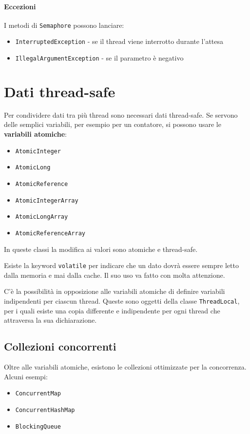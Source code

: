 \paragraph{Eccezioni} I metodi di \texttt{Semaphore} possono lanciare:
\begin{itemize}
\item \texttt{InterruptedException} - se il thread viene interrotto durante l'attesa
\item \texttt{IllegalArgumentException} - se il parametro è negativo
\end{itemize}

\section{Dati thread-safe}
Per condividere dati tra più thread sono necessari dati thread-safe. Se servono delle semplici variabili, per esempio per un contatore, si possono usare le \textbf{variabili atomiche}:
\begin{itemize}
\item \texttt{AtomicInteger}
\item \texttt{AtomicLong}
\item \texttt{AtomicReference}
\item \texttt{AtomicIntegerArray}
\item \texttt{AtomicLongArray}
\item \texttt{AtomicReferenceArray}
\end{itemize}
In queste classi la modifica ai valori sono atomiche e thread-safe.

Esiste la keyword \texttt{volatile} per indicare che un dato dovrà essere sempre letto dalla memoria e mai dalla cache. Il suo uso va fatto con molta attenzione.

C'è la possibilità in opposizione alle variabili atomiche di definire variabili indipendenti per ciascun thread. Queste sono oggetti della classe \texttt{ThreadLocal}, per i quali esiste una copia differente e indipendente per ogni thread che attraversa la sua dichiarazione.

\subsection{Collezioni concorrenti}
Oltre alle variabili atomiche, esistono le collezioni ottimizzate per la concorrenza. Alcuni esempi:
\begin{itemize}
\item \texttt{ConcurrentMap}
\item \texttt{ConcurrentHashMap}
\item \texttt{BlockingQueue}
\end{itemize}


